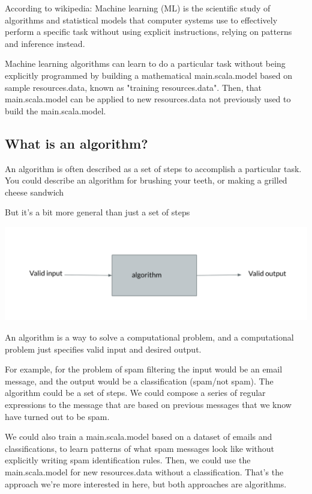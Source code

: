 \documentclass[12pt]{article}
\begin{document}
According to wikipedia:
Machine learning (ML) is the scientific study of algorithms and statistical models that computer systems use to 
effectively perform a specific task without using explicit instructions, relying on patterns and inference instead.


Machine learning algorithms can learn to do a particular task without being explicitly programmed by building a 
mathematical main.scala.model based on sample resources.data, known as "training resources.data". Then, that main.scala.model can be applied to new resources.data
not previously used to build the main.scala.model.

\subsection{What is an algorithm?}

An algorithm is often described as a set of steps to accomplish a particular task. You could describe an algorithm for brushing your teeth, or making a grilled cheese sandwich 

But it's a bit more general than just a set of steps 

\includegraphics[width={\textwidth}]{algo-abstract}


An algorithm is a way to solve a computational problem, and a computational problem just specifies valid input and desired output. 

For example, for the problem of spam filtering the input would be an email message, and the output would be a 
classification (spam/not spam). The algorithm could be a set of steps. We could compose a series of regular expressions to 
the message that are based on previous messages that we know have turned out to be spam. 

We could also train a main.scala.model based on a dataset of emails and classifications, to learn patterns of what spam messages
look like without explicitly writing spam identification rules. Then, we could use the main.scala.model for new resources.data without a
classification. That's the approach we're more interested in here, but both approaches are algorithms.
\end{document}
